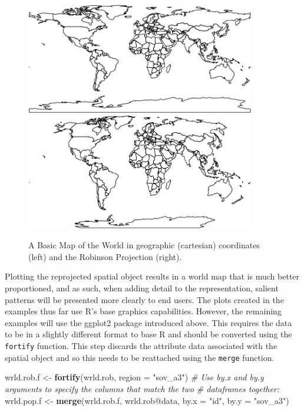 \documentclass[]{article}
\newenvironment{Shaded}{}{}
\newcommand{\KeywordTok}[1]{\textcolor[rgb]{0.00,0.44,0.13}{\textbf{{#1}}}}
\newcommand{\DataTypeTok}[1]{\textcolor[rgb]{0.56,0.13,0.00}{{#1}}}
\newcommand{\StringTok}[1]{\textcolor[rgb]{0.25,0.44,0.63}{{#1}}}
\newcommand{\CommentTok}[1]{\textcolor[rgb]{0.38,0.63,0.69}{\textit{{#1}}}}
\newcommand{\NormalTok}[1]{{#1}}
\let\Oldincludegraphics\includegraphics
\renewcommand{\includegraphics}[1]{\Oldincludegraphics[width=10cm]{#1}}
\begin{document}
\begin{figure}[htbp]
\includegraphics{figs/A_Basic_Map_of_the_World}
\includegraphics{figs/The_Robinson_Projection}
\caption{A Basic Map of the World in geographic (cartesian) coordinates (left) and the Robinson Projection (right).}
\label{frobmap}
\end{figure}

Plotting the reprojected spatial object results in a world map that is much better proportioned, and as such, when 
adding detail to the representation, salient patterns will be presented more clearly to end users. The
plots created in the examples thus far use R's base graphics capabilities. However, the remaining examples will use the ggplot2
package introduced above. This requires the data to be in a slightly different format to base R and should be converted using the \texttt{fortify} function. This step discards the attribute data associated with the spatial object and so this needs to be reattached using the \texttt{merge} function.

\begin{Shaded}
\begin{Highlighting}[]
\NormalTok{wrld.rob.f <- }\KeywordTok{fortify}\NormalTok{(wrld.rob, }\DataTypeTok{region =} \StringTok{"sov_a3"}\NormalTok{)}
\CommentTok{# Use by.x and by.y arguments to specify the columns that match the two}
\CommentTok{# dataframes together:}
\NormalTok{wrld.pop.f <- }\KeywordTok{merge}\NormalTok{(wrld.rob.f, wrld.rob@data, }\DataTypeTok{by.x =} \StringTok{"id"}\NormalTok{, }\DataTypeTok{by.y =} \StringTok{"sov_a3"}\NormalTok{)}
\end{Highlighting}
\end{Shaded}
\end{document}
